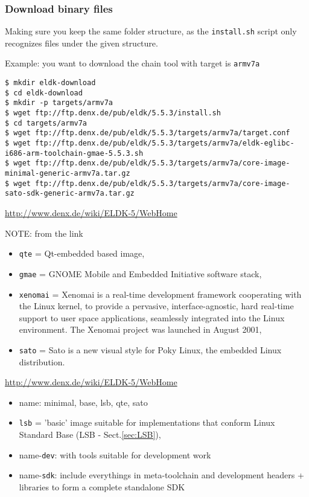 \subsubsection{Download binary files}

Making sure you keep the same folder structure, as the \verb!install.sh!
script only recognizes files under the given structure.

Example: you want to download the chain tool with target is \verb!armv7a!
\begin{verbatim}
$ mkdir eldk-download
$ cd eldk-download
$ mkdir -p targets/armv7a
$ wget ftp://ftp.denx.de/pub/eldk/5.5.3/install.sh
$ cd targets/armv7a
$ wget ftp://ftp.denx.de/pub/eldk/5.5.3/targets/armv7a/target.conf
$ wget ftp://ftp.denx.de/pub/eldk/5.5.3/targets/armv7a/eldk-eglibc-i686-arm-toolchain-gmae-5.5.3.sh
$ wget ftp://ftp.denx.de/pub/eldk/5.5.3/targets/armv7a/core-image-minimal-generic-armv7a.tar.gz
$ wget ftp://ftp.denx.de/pub/eldk/5.5.3/targets/armv7a/core-image-sato-sdk-generic-armv7a.tar.gz
\end{verbatim}
\url{http://www.denx.de/wiki/ELDK-5/WebHome}

NOTE: from the  link
\begin{itemize}
  \item \verb!qte! = Qt-embedded based image, 
  
  \item \verb!gmae! = GNOME Mobile and
Embedded Initiative software stack, 
 
   \item  \verb!xenomai! = Xenomai is a real-time
development framework cooperating with the Linux kernel, to provide a pervasive,
interface-agnostic, hard real-time support to user space applications,
seamlessly integrated into the Linux environment. The Xenomai project was
launched in August 2001,

   \item \verb!sato! = Sato is a new visual style for Poky Linux, the embedded
   Linux distribution.
  
\end{itemize}

\url{http://www.denx.de/wiki/ELDK-5/WebHome}
\begin{itemize}
  \item name: minimal, base, lsb, qte, sato 

  \item  \verb!lsb! = 'basic' image suitable for implementations that conform Linux Standard Base (LSB - Sect.\ref{sec:LSB}),

  \item name-\verb!dev!: with tools suitable for development work
  
  \item name-\verb!sdk!: include everythings in meta-toolchain and development headers + libraries
  to form a complete standalone SDK
\end{itemize}

